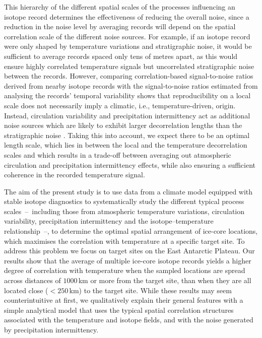 \documentclass[draft]{agujournal2019}
\begin{document}
This hierarchy of the different spatial scales of the processes influencing an
isotope record determines the effectiveness of reducing the overall noise, since
a reduction in the noise level by averaging records will depend on the spatial
correlation scale of the different noise sources. For example, if an isotope
record were only shaped by temperature variations and stratigraphic noise, it
would be sufficient to average records spaced only tens of metres apart, as this
would ensure highly correlated temperature signals but uncorrelated
stratigraphic noise between the records. However, comparing correlation-based
signal-to-noise ratios derived from nearby isotope records
\cite{Munch2016,Munch2017} with the signal-to-noise ratios estimated from
analysing the records' temporal variability \cite{Laepple2018} shows that
reproducibility on a local scale does not necessarily imply a climatic, i.e.,
temperature-driven, origin. Instead, circulation variability and precipitation
intermittency act as additional noise sources which are likely to exhibit larger
decorrelation lengths than the stratigraphic noise
\cite{Laepple2018,Munch2018a}. Taking this into account, we expect there to be
an optimal length scale, which lies in between the local and the temperature
decorrelation scales and which results in a trade-off between averaging out
atmospheric circulation and precipitation intermittency effects, while also
ensuring a sufficient coherence in the recorded temperature signal.

The aim of the present study is to use data from a climate model equipped with
stable isotope diagnostics to systematically study the different typical process
scales~--~including those from atmospheric temperature variations, circulation
variability, precipitation intermittency and the isotope--temperature
relationship~--, to determine the optimal spatial arrangement of ice-core
locations, which maximises the correlation with temperature at a specific target
site. To address this problem we focus on target sites on the East Antarctic
Plateau. Our results show that the average of multiple ice-core isotope records
yields a higher degree of correlation with temperature when the sampled
locations are spread across distances of $1000$\,km or more from the target
site, than when they are all located close ($<250$\,km) to the target
site. While these results may seem counterintuitive at first, we qualitatively
explain their general features with a simple analytical model that uses the
typical spatial correlation structures associated with the temperature and
isotope fields, and with the noise generated by precipitation intermittency.
\end{document}
